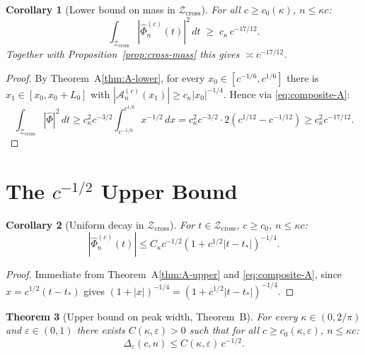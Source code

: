 \documentclass[12pt,a4paper]{amsart}
\newtheorem{theorem}{Theorem}[section]
\newtheorem{corollary}[theorem]{Corollary}
\theoremstyle{definition}
\theoremstyle{remark}
\newcommand{\Zcross}{\mathcal{Z}_{\mathrm{cross}}}
\newcommand{\tstar}{t_*}
\begin{document}
\begin{corollary}[Lower bound on mass in $\Zcross$]
\label{cor:cross-mass-lower}
For all $c \ge c_0(\kappa)$, $n \le \kappa c$:
\[
\int_{\Zcross}|\widehat{\Phi}_n^{(c)}(t)|^2\,dt
\;\ge\; c_\kappa\,c^{-17/12}.
\]
Together with Proposition~\ref{prop:cross-mass}
this gives $\asymp c^{-17/12}$.
\end{corollary}

\begin{proof}
By Theorem~A\eqref{thm:A-lower},
for every $x_0 \in [c^{-1/6},c^{1/6}]$
there is $x_1 \in [x_0,x_0+L_0]$ with
$|\mathcal{A}_n^{(c)}(x_1)| \ge c_\kappa|x_0|^{-1/4}$.
Hence via \eqref{eq:composite-A}:
\[
\int_{\Zcross}|\widehat{\Phi}|^2\,dt
\ge c_\kappa^2 c^{-3/2}
\int_{c^{-1/6}}^{c^{1/6}} x^{-1/2}\,dx
= c_\kappa^2 c^{-3/2}\cdot 2(c^{1/12}-c^{-1/12})
\ge c_\kappa^2 c^{-17/12}.
\]
\end{proof}

\section{The $c^{-1/2}$ Upper Bound}
\label{sec:upper}

\begin{corollary}[Uniform decay in $\Zcross$]
\label{cor:uniform-decay}
For $t \in \Zcross$, $c \ge c_0$, $n \le \kappa c$:
\begin{equation}
\label{eq:uniform-decay}
|\widehat{\Phi}_n^{(c)}(t)|
\le C_\kappa c^{-1/2}(1+c^{1/2}|t-\tstar|)^{-1/4}.
\end{equation}
\end{corollary}

\begin{proof}
Immediate from Theorem~A\eqref{thm:A-upper}
and \eqref{eq:composite-A},
since $x = c^{1/2}(t-\tstar)$ gives
$(1+|x|)^{-1/4} = (1+c^{1/2}|t-\tstar|)^{-1/4}$.
\end{proof}

\begin{theorem}[Upper bound on peak width, Theorem~B]
\label{thm:B}
For every $\kappa\in(0,2/\pi)$ and $\varepsilon\in(0,1)$
there exists $C(\kappa,\varepsilon)>0$ such that
for all $c \ge c_0(\kappa,\varepsilon)$, $n \le \kappa c$:
\begin{equation}
\label{eq:thm-B}
\Delta_\varepsilon(c,n) \le C(\kappa,\varepsilon)\,c^{-1/2}.
\end{equation}
\end{theorem}
\end{document}
